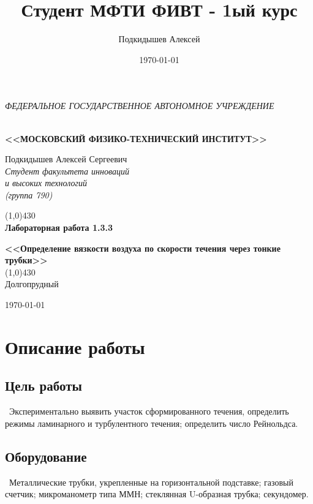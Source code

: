 \documentclass[a4paper,12pt]{article}
\author{Подкидышев Алексей}
\title{Студент МФТИ ФИВТ - 1ый курс}
\date{\today}
\theoremstyle{plain} %
\theoremstyle{definition} %
\theoremstyle{remark} %
\renewcommand{\headrulewidth}{0mm}  %
\begin{document}

\begin{center}
	\textit{\MakeTextUppercase{федеральное государственное автономное учреждение}}
		
	\vspace{0.5ex}
	
	\textbf{ \\ \MakeTextUppercase{<<Московский Физико-технический институт>>}}
\end{center}
\vspace{13ex}
\begin{flushright}
	\noindent
	{Подкидышев Алексей Сергеевич}
	\\
	\textit{Студент факультета инноваций\\ и высоких технологий\\(группа 790)}
\end{flushright}
\begin{center}
	\vspace{23ex}
	\line(1,0){430}\\[4ex]
	{\LARGE\textbf{Лабораторная работа 1.3.3}}
	\vspace{2ex}
	
		
	\textbf{\large{<<Определение вязкости воздуха по скорости течения через тонкие трубки>>}}\\[3ex]
	\line(1,0){430}\\[5ex]
	\vfill
	Долгопрудный 
	
	{\today}
\end{center}

\newpage
\renewcommand{\headrulewidth}{1pt}

\section{Описание работы}

\subsection{Цель работы}\
\indent Экспериментально выявить участок сформированного течения, определить режимы ламинарного и турбулентного течения; определить число Рейнольдса.

\subsection{Оборудование}\
\indent Металлические трубки, укрепленные на горизонтальной подставке; газовый счетчик; микроманометр типа ММН; стеклянная U-образная трубка; секундомер.
\end{document}
